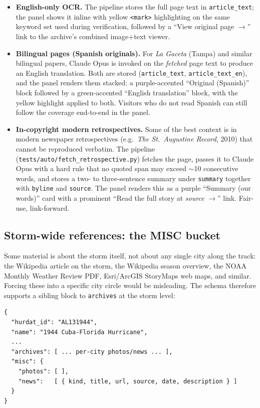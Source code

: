 \documentclass[11pt,letterpaper]{article}
\begin{document}
\begin{itemize}[leftmargin=1.5em]
  \item \textbf{English-only OCR.} The pipeline stores the full page text in \texttt{article\_text}; the panel shows it inline with yellow \texttt{<mark>} highlighting on the same keyword set used during verification, followed by a ``View original page $\rightarrow$'' link to the archive's combined image+text viewer.
  \item \textbf{Bilingual pages (Spanish originals).} For \emph{La Gaceta} (Tampa) and similar bilingual papers, Claude Opus is invoked on the \emph{fetched} page text to produce an English translation. Both are stored (\texttt{article\_text}, \texttt{article\_text\_en}), and the panel renders them stacked: a purple-accented ``Original (Spanish)'' block followed by a green-accented ``English translation'' block, with the yellow highlight applied to both. Visitors who do not read Spanish can still follow the coverage end-to-end in the panel.
  \item \textbf{In-copyright modern retrospectives.} Some of the best context is in modern newspaper retrospectives (e.g.\ \emph{The St.\ Augustine Record}, 2010) that cannot be reproduced verbatim. The pipeline (\texttt{tests/auto/fetch\_retrospective.py}) fetches the page, passes it to Claude Opus with a hard rule that no quoted span may exceed $\sim$10 consecutive words, and stores a two- to three-sentence summary under \texttt{summary} together with \texttt{byline} and \texttt{source}. The panel renders this as a purple ``Summary (our words)'' card with a prominent ``Read the full story at \emph{source} $\rightarrow$'' link. Fair-use, link-forward.
\end{itemize}

\subsection{Storm-wide references: the MISC bucket}

Some material is about the storm itself, not about any single city along the track: the Wikipedia article on the storm, the Wikipedia season overview, the NOAA Monthly Weather Review PDF, Esri/ArcGIS StoryMaps web maps, and similar. Forcing these into a specific city circle would be misleading. The schema therefore supports a sibling block to \texttt{archives} at the storm level:

\begin{lstlisting}[caption={Storm-wide references block}]
{
  "hurdat_id": "AL131944",
  "name": "1944 Cuba-Florida Hurricane",
  ...
  "archives": [ ... per-city photos/news ... ],
  "misc": {
    "photos": [ ],
    "news":   [ { kind, title, url, source, date, description } ]
  }
}
\end{lstlisting}
\end{document}
